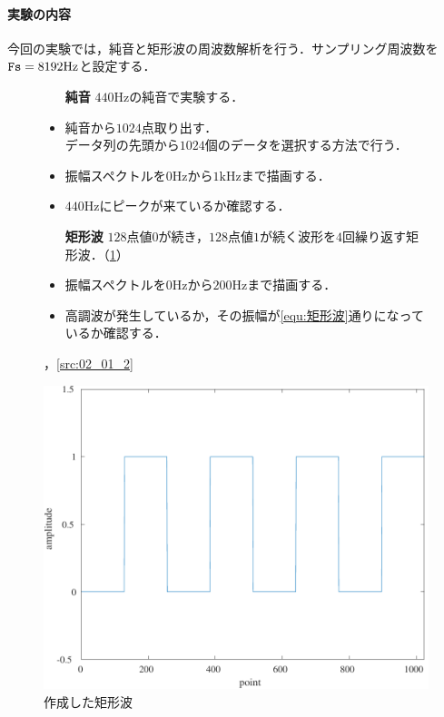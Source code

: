 \paragraph{実験の内容}今回の実験では，純音と矩形波の周波数解析を行う．サンプリング周波数を\(\textrm{\texttt{Fs}}=8192\textrm{Hz}\)と設定する．
\begin{figure}[H]
    \begin{minipage}[c]{.55\textwidth}
        \begin{itemize}
            \item[\textbf{純音}] \(440\textrm{Hz}\)の純音で実験する．
            \item 純音から\(1024\)点取り出す．\\
                  データ列の先頭から\(1024\)個のデータを選択する方法で行う．
            \item 振幅スペクトルを\(0\textrm{Hz}\)から\(1\textrm{kHz}\)まで描画する．
            \item \(440\textrm{Hz}\)にピークが来ているか確認する．
            \item[\textbf{矩形波}] \(128\)点値\(0\)が続き，\(128\)点値\(1\)が続く波形を\(4\)回繰り返す矩形波．（\ref{fig:作成した矩形波}）
            \item 振幅スペクトルを\(0\textrm{Hz}\)から\(200\textrm{Hz}\)まで描画する．
            \item 高調波が発生しているか，その振幅が\eqref{equ:矩形波}通りになっているか確認する．
        \end{itemize}
        ，\ref{src:02_01_2}
    \end{minipage}
    \begin{minipage}[c]{.4\textwidth}
        \centering
        \includegraphics[keepaspectratio,width=\textwidth]{../../Figures/02_021.pdf}
        \caption{作成した矩形波}
        \label{fig:作成した矩形波}
    \end{minipage}
\end{figure}
